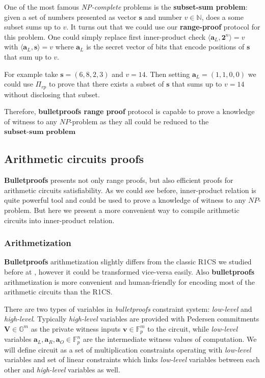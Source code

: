 \documentclass[../lecture-notes-148x210.tex]{subfiles}
\begin{document}
\begin{example}
    One of the most famous \textit{NP-complete} problems is the \textbf{subset-sum problem}: given a set of numbers presented as vector $\mathbf{s}$ and number $v \in \mathbb{N}$, does a some subset sums up to $v$. It turns out that we could use our \textbf{range-proof} protocol for this problem. One could simply replace first inner-product check $\langle \mathbf{a}_L, \mathbf{2}^n \rangle = v$ with $\langle \mathbf{a}_L, \mathbf{s} \rangle = v$ where $\mathbf{a}_L$ is the secret vector of bits that encode positions of $\mathbf{s}$ that sum up to $v$.

    For example take $\mathbf{s} = (6,8,2,3)$ and $v = 14$. Then setting $\mathbf{a}_L = (1,1,0,0)$ we could use $\Pi_{rp}$ to prove that there exists a subset of $\mathbf{s}$ that sums up to $v=14$ without disclosing that subset.

    Therefore, \textbf{bulletproofs range proof} protocol is capable to prove a knowledge of witness to any $NP$-problem as they all could be reduced to the $\textbf{subset-sum problem}$
\end{example}
\subsection{Arithmetic circuits proofs}\label{subsection:bulletproofs-arithmetic-circuits}

\textbf{Bulletproofs} presents not only range proofs, but also efficient proofs for arithmetic circuits satisfiability. As we could see before, inner-product relation is quite powerful tool and could be used to prove a knowledge of witness to any $NP$-problem. But here we present a more convenient way to compile arithmetic circuits into inner-product relation.

\subsubsection{Arithmetization}

\textbf{Bulletproofs} arithmetization slightly differs from the classic R1CS we studied before at , however it could be transformed vice-versa easily. Also \textbf{bulletproofs} arithmetization is more convenient and human-friendly for encoding most of the arithmetic circuits than the R1CS.

There are two types of variables in \textit{bulletproofs} constraint system: \textit{low-level} and \textit{high-level}. Typically \textit{high-level} variables are provided with Pedersen commitments $\mathbf{V} \in \mathbb{G}^m$ as the private witness inputs $\mathbf{v} \in \mathbb{F}_p^m$ to the circuit, while \textit{low-level} variables $\mathbf{a}_L, \mathbf{a}_R, \mathbf{a}_O \in \mathbb{F}_p^n$ are the intermediate witness values of computation. We will define circuit as a set of multiplication constraints operating with \textit{low-level} variables and set of linear constraints which links \textit{low-level} variables between each other and \textit{high-level} variables as well.
\end{document}
